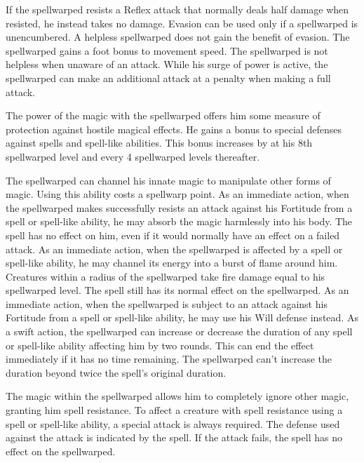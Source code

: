  If the spellwarped resists a Reflex attack that normally deals half damage when resisted, he instead takes no damage. Evasion can be used only if a spellwarped is unencumbered. A helpless spellwarped does not gain the benefit of evasion.
 The spellwarped gains a  foot bonus to movement speed.
 The spellwarped is not helpless when unaware of an attack.
 While his surge of power is active, the spellwarped can make an additional attack at a  penalty when making a full attack.

 The power of the magic with the spellwarped offers him some measure of protection against hostile magical effects. He gains a  bonus to special defenses against spells and spell-like abilities. This bonus increases by  at his 8th spellwarped level and every 4 spellwarped levels thereafter.

 The spellwarped can channel his innate magic to manipulate other forms of magic. Using this ability costs a spellwarp point. 
 As an immediate action, when the spellwarped makes successfully resists an attack against his Fortitude from a spell or spell-like ability, he may absorb the magic harmlessly into his body. The spell has no effect on him, even if it would normally have an effect on a failed attack.
 As an immediate action, when the spellwarped is affected by a spell or spell-like ability, he may channel its energy into a burst of flame around him. Creatures within a \areasmall radius of the spellwarped take fire damage equal to his spellwarped level. The spell still has its normal effect on the spellwarped.
 As an immediate action, when the spellwarped is subject to an attack against his Fortitude from a spell or spell-like ability, he may use his Will defense instead.
 As a swift action, the spellwarped can increase or decrease the duration of any spell or spell-like ability affecting him by two rounds. This can end the effect immediately if it has no time remaining. The spellwarped can't increase the duration beyond twice the spell's original duration.

 The magic within the spellwarped allows him to completely ignore other magic, granting him spell resistance. To affect a creature with spell resistance using a spell or spell-like ability, a special attack is always required. The defense used against the attack is indicated by the spell. If the attack fails, the spell has no effect on the spellwarped.

